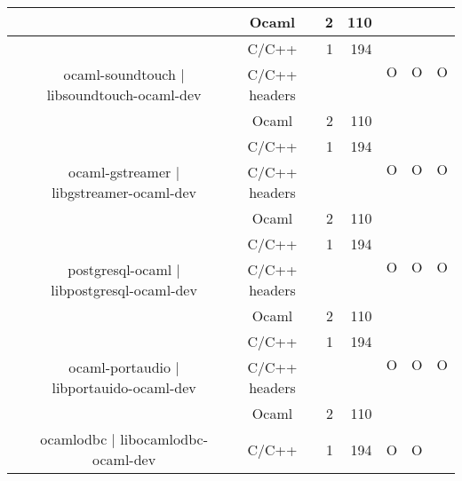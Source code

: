 \documentclass[11pt,a4paper]{article}
\begin{document}
\begin{table}[h,t]
\begin{tabular}{|>{\centering}m{3cm}| c|c|r|r| c| c|c|}
 \cline{3-5}   
 &                                  & Ocaml & 2 & 110  & & & \\       
 \cline{2-8}


 &\multirow{3}{3cm}{ocaml-soundtouch | libsoundtouch-ocaml-dev} & C/C++ & 1 & 194  & \multirow{2}{*}{O} & \multirow{2}{*}{O} &

 \multirow{2}{*}{O}\\
 \cline{3-5}
 & &                           C/C++ headers &  &  & & & \\

 \cline{3-5}   
 &                                  & Ocaml & 2 & 110  & & & \\       
 \cline{2-8}


 &\multirow{3}{3cm}{ocaml-gstreamer | libgstreamer-ocaml-dev} & C/C++ & 1 & 194  & \multirow{2}{*}{O} & \multirow{2}{*}{O} &

 \multirow{2}{*}{O}\\

 \cline{3-5}
 & &                           C/C++ headers &  &  & & & \\

 \cline{3-5}   
 &                                  & Ocaml & 2 & 110  & & & \\       
 \cline{2-8}


 &\multirow{3}{3cm}{postgresql-ocaml | libpostgresql-ocaml-dev} & C/C++ & 1 & 194  & \multirow{2}{*}{O} & \multirow{2}{*}{O} &

 \multirow{2}{*}{O}\\
 \cline{3-5}
 & &                           C/C++ headers &  &  & & & \\

 \cline{3-5}   
 &                                  & Ocaml & 2 & 110  & & & \\       
 \cline{2-8}



 &\multirow{3}{3cm}{ocaml-portaudio | libportauido-ocaml-dev} & C/C++ & 1 & 194  & \multirow{2}{*}{O} & \multirow{2}{*}{O} &

 \multirow{2}{*}{O}\\
 \cline{3-5}
 & &                           C/C++ headers &  &  & & & \\

 \cline{3-5}   
 &                                  & Ocaml & 2 & 110  & & & \\       
 \cline{2-8}



 &\multirow{3}{3cm}{ocamlodbc | libocamlodbc-ocaml-dev} & C/C++ & 1 & 194  & \multirow{2}{*}{O} & \multirow{2}{*}{O} &


\end{tabular}
\end{table}
\end{document}
